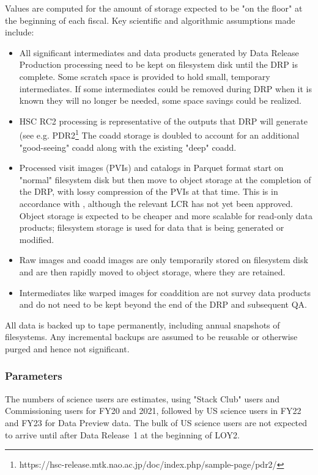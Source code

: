 Values are computed for the amount of storage expected to be "on the floor" at the beginning of each fiscal.
Key scientific and algorithmic assumptions made include:
\begin{itemize}
\item All significant intermediates and data products generated by Data Release Production processing need to be kept on filesystem disk until the DRP is complete.
Some scratch space is provided to hold small, temporary intermediates.
If some intermediates could be removed during DRP when it is known they will no longer be needed, some space savings could be realized.
\item HSC RC2 processing is representative of the outputs that DRP will generate (see e.g. PDR2\footnote{https://hsc-release.mtk.nao.ac.jp/doc/index.php/sample-page/pdr2/}
The coadd storage is doubled to account for an additional "good-seeing" coadd along with the existing "deep" coadd.
\item Processed visit images (PVIs) and catalogs in Parquet format start on "normal" filesystem disk but then move to object storage at the completion of the DRP, with lossy compression of the PVIs at that time.
This is in accordance with , although the relevant LCR has not yet been approved.
Object storage is expected to be cheaper and more scalable for read-only data products; filesystem storage is used for data that is being generated or modified.
\item Raw images and coadd images are only temporarily stored on filesystem disk and are then rapidly moved to object storage, where they are retained.
\item Intermediates like warped images for coaddition are not survey data products and do not need to be kept beyond the end of the DRP and subsequent QA.
\end{itemize}

All data is backed up to tape permanently, including annual snapshots of filesystems.
Any incremental backups are assumed to be reusable or otherwise purged and hence not significant.

\subsubsection{Parameters}

The numbers of science users are estimates, using "Stack Club" users and Commissioning users for FY20 and 2021, followed by US science users in FY22 and FY23 for Data Preview data.
The bulk of US science users are not expected to arrive until after Data Release~1 at the beginning of LOY2.

